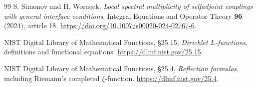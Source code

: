 \begin{thebibliography}{99}
S. Simonov and H. Woracek, \emph{Local spectral multiplicity of selfadjoint
couplings with general interface conditions}, Integral Equations and
Operator Theory \textbf{96} (2024), article 18.
\url{https://doi.org/10.1007/s00020-024-02767-6}.

NIST Digital Library of Mathematical Functions, \S25.15,
\emph{Dirichlet $L$-functions}, definitions and functional equations.
\url{https://dlmf.nist.gov/25.15}.

NIST Digital Library of Mathematical Functions, \S25.4,
\emph{Reflection formulas}, including Riemann's completed $\xi$-function.
\url{https://dlmf.nist.gov/25.4}.
\end{thebibliography}
